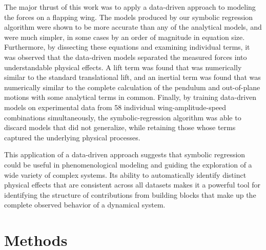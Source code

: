 \documentclass[fleqn,10pt]{wlscirep}
\begin{document}
The major thrust of this work was to apply a data-driven approach to modeling
the forces on a flapping wing.  The models produced by our symbolic regression
algorithm were shown to be more accurate than any of the analytical models, and
were much simpler, in some cases by an order of magnitude in equation size.
Furthermore, by dissecting these equations and examining individual terms, it
was observed that the data-driven models separated the measured forces into
understandable physical effects.  A lift term was found that was numerically
similar to the standard translational lift, and an inertial term was found that
was numerically similar to the complete calculation of the pendulum and
out-of-plane motions with some analytical terms in common.  Finally, by
training data-driven models on experimental data from 58 individual
wing-amplitude-speed combinations simultaneously, the symbolic-regression
algorithm was able to discard models that did not generalize, while retaining
those whose terms captured the underlying physical processes.

This application of a data-driven approach suggests that symbolic regression
could be useful in phenomenological modeling and guiding the exploration of a
wide variety of complex systems.  Its ability to automatically identify
distinct physical effects that are consistent across all datasets makes it a
powerful tool for identifying the structure of contributions from building
blocks that make up the complete observed behavior of a dynamical system.

\section*{Methods}

\end{document}
